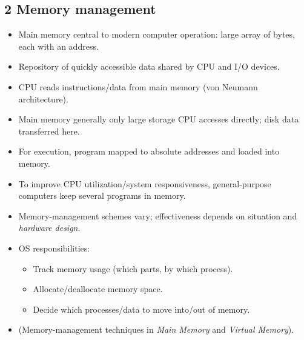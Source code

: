 \documentclass{article}
\begin{document}
\subsection*{2 Memory management}
\begin{itemize}
    \item Main memory central to modern computer operation: large array of bytes, each with an address.
    \item Repository of quickly accessible data shared by CPU and I/O devices.
    \item CPU reads instructions/data from main memory (von Neumann architecture).
    \item Main memory generally only large storage CPU accesses directly; disk data transferred here.
    \item For execution, program mapped to absolute addresses and loaded into memory.
    \item To improve CPU utilization/system responsiveness, general-purpose computers keep several programs in memory.
    \item Memory-management schemes vary; effectiveness depends on situation and \textit{hardware design}.
    \item OS responsibilities:
    \begin{itemize}
        \item Track memory usage (which parts, by which process).
        \item Allocate/deallocate memory space.
        \item Decide which processes/data to move into/out of memory.
    \end{itemize}
    \item (Memory-management techniques in \textit{Main Memory} and \textit{Virtual Memory}).
\end{itemize}
\end{document}
